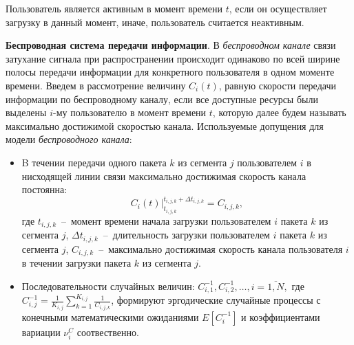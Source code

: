 Пользователь является активным в момент времени $t$, если он осуществляет загрузку в данный момент, иначе, пользователь считается неактивным.

\textbf{Беспроводная система передачи информации}. В \textit{беспроводном канале} связи затухание сигнала при распространении происходит одинаково по всей ширине полосы передачи информации для конкретного пользователя в одном моменте времени. Введем в рассмотрение величину $C_i(t)$, равную скорости передачи информации по беспроводному каналу, если все доступные ресурсы были выделены $i$-му пользователю в момент времени $t$, которую далее будем называть максимально достижимой скоростью канала.
\newline
Используемые допущения для модели \textit{беспроводного канала}:
\begin{itemize}
	\item B течении передачи одного пакета $k$ из сегмента $j$ пользователем $i$ в нисходящей линии связи максимально достижимая скорость канала постоянна: $$\left.C_i(t)\right\vert^{t_{i,j,k}+\Delta t_{i,j,k}}_{t_{i,j,k}}=C_{i,j,k},$$
	где $t_{i,j,k}$~--~момент времени начала загрузки пользователем $i$ пакета $k$ из сегмента $j$, $\Delta t_{i,j,k}$~--~длительность загрузки пользователем $i$ пакета $k$ из сегмента $j$, $C_{i,j,k}$~--~максимально достижимая скорость канала пользователя $i$ в течении загрузки пакета $k$ из сегмента $j$.
	\item Последовательности случайных величин: $C^{-1}_{i,1}, C^{-1}_{i,2}, \ldots, i=\overline{1,N},$
	где $C_{i,j}^{-1} = \frac{1}{K_{i,j}}\sum\limits_{k=1}^{K_{i,j}} \frac{1}{C_{i,j,k}}$, формируют эргодические случайные процессы с конечными математическими ожиданиями $E[C_i^{-1}]$ и коэффициентами вариации $\nu^{C}_i$ соотвественно.
\end{itemize}

